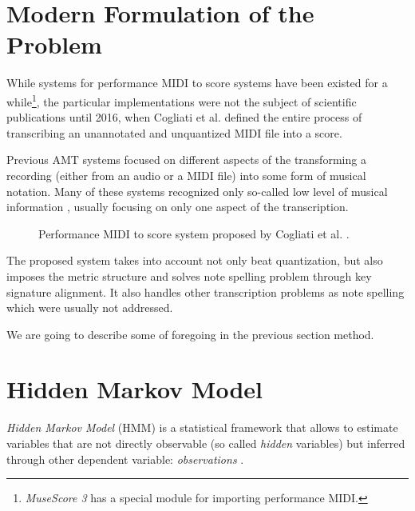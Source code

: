 \section{Modern Formulation of the Problem}

While systems for performance MIDI to score systems have been existed for a while\footnote{\emph{MuseScore 3} has a special module for importing performance MIDI. \missing}, the particular implementations were not the subject of scientific publications until 2016, when Cogliati et al. defined the entire process of transcribing an unannotated and unquantized MIDI file into a score. 

Previous AMT systems focused on different aspects of the transforming a recording (either from an audio or a MIDI file) into some form of musical notation. Many of these systems recognized only so-called low level of musical information \cite{Cogliati2016}, usually focusing on only one aspect of the transcription.

\begin{figure}[!ht]
\centering

\caption[Performance MIDI to score system proposed by Cogliati et al.]{Performance MIDI to score system proposed by Cogliati et al. \cite{Cogliati2016}.}
\end{figure}

The proposed system takes into account not only beat quantization, but also imposes the metric structure and solves note spelling problem through key signature alignment. It also handles other transcription problems as note spelling which were usually not addressed.

We are going to describe some of foregoing in the previous section method.

\section{Hidden Markov Model}

\emph{Hidden Markov Model} (HMM) is a statistical framework that allows to estimate variables that are not directly observable (so called \emph{hidden} variables) but inferred through other dependent variable: \emph{observations} \cite[p. 210--213]{Jurafsky2009}.

